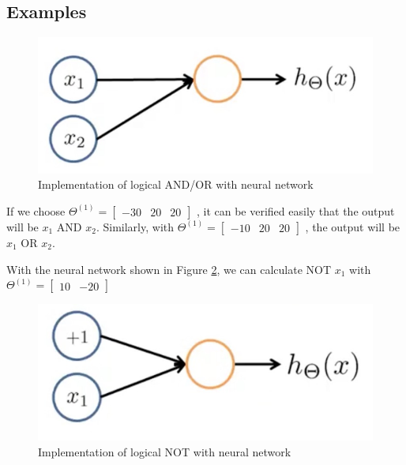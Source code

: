 \subsection{Examples}
\begin{figure}[ht]
\centering
\includegraphics[width = 0.5 \textwidth]{neuraland.jpg}
\caption{Implementation of logical AND/OR with neural network}\label{neuraland}
\end{figure}
If we choose 
\begin{math}
\Theta^{(1)} = \begin{bmatrix}-30 & 20 & 20\end{bmatrix}
\end{math}
, it can be verified easily that the output will be $x_1$ AND $x_2$. Similarly, with
\begin{math}
\Theta^{(1)} = \begin{bmatrix}-10 & 20 & 20\end{bmatrix}
\end{math}
, the output will be $x_1$ OR $x_2$.

With the neural network shown in Figure \ref{neuralnot}, we can calculate NOT $x_1$ with 
\begin{math}
\Theta^{(1)} = \begin{bmatrix}10 & -20\end{bmatrix}
\end{math}
\begin{figure}[ht]
\centering
\includegraphics[width = 0.5 \textwidth]{neuralnot.jpg}
\caption{Implementation of logical NOT with neural network}\label{neuralnot}
\end{figure}

